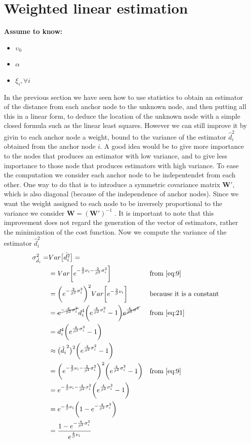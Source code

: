 \documentclass[12pt,twoside]{report}
\begin{document}
\section{Weighted linear estimation}
  \begin{center}
  \textbf{Assume to know:}
  \begin{itemize}
    \centering
    \item $\upsilon_0$
    \item $\alpha$
    \item $\xi_i,\forall i$
  \end{itemize}
  \end{center}
In the previous section we have seen how to use statistics to obtain an estimator of the distance from each anchor node to the unknown node, and then putting all this in a linear form, to deduce the location of the unknown node with a simple closed formula such as the linear least squares. However we can still improve it by givin to each anchor node a weight, bound to the variance of the estimator $\hat{d}_i^2$ obtained from the anchor node $i$. A good idea would be to give more importance to the nodes that produces an estimator with low variance, and to give less importance to those node that produces estimators with high variance. To ease the computation we consider each anchor node to be indepentendet from each other. One way to do that is to introduce a symmetric covariance matrix $\mathbf{W}'$, which is also diagonal (because of the independence of anchor nodes). Since we want the weight assigned to each node to be inversely proportional to the variance we consider $\mathbf{W}=(\mathbf{W}')^{-1}$ \cite{rzk,899498y4hd}. It is important to note that this improvement does not regard the generation of the vector of estimators, rather the minimization of the cost function. Now we compute the variance of the estimator $\hat{d}_i^2$
\begin{align}
\sigma^2_{\hat{d_i}}=&Var\big[\hat{d_i^2}\big]=&& \\
&=Var\bigg[e^{-\frac{2}{\beta}\nu_i-\frac{2}{\beta^2}\sigma^2_i}\bigg] && \text{from \ref{eq:9}}\\
&=\bigg(e^{-\frac{2}{\beta^2}\sigma^2_i}\bigg)^2Var\bigg[e^{-\frac{2}{\beta}\nu_i}\bigg]&& \text{because it is a constant}\\
&=\cancel{e^{-\frac{4}{\beta^2}\sigma^2_i}}d_i^4\bigg(e^{\frac{4}{\beta^2}\sigma_i^2}-1\bigg)\cancel{e^{\frac{4}{\beta^2}\sigma^2}} &&\text{from } \ref{eq:21}\\
&=d_i^4\bigg(e^{\frac{4}{\beta^2}\sigma_i^2}-1\bigg)\\
&\approx \big(\hat{d_i}^2\big)^2\bigg(e^{\frac{4}{\beta^2}\sigma_i^2}-1\bigg)\\
&=\bigg(e^{-\frac{2}{\beta}\nu_i-\frac{2}{\beta^2}\sigma^2_i}\bigg)^2\bigg(e^{\frac{4}{\beta^2}\sigma_i^2}-1\bigg)&&\text{from }\ref{eq:9}\\
&=e^{-\frac{4}{\beta}\nu_i-\frac{4}{\beta^2}\sigma^2_i}\bigg(e^{\frac{4}{\beta^2}\sigma^2_i}-1\bigg)\\
&=e^{-\frac{4}{\beta}\nu_i}\bigg(1-e^{-\frac{4}{\beta^2}\sigma^2_i}\bigg)\\
&=\frac{1-e^{-\frac{4}{\beta^2}\sigma^2_i}}{e^{\frac{4}{\beta}\nu_i}}
\end{align}
\end{document}
